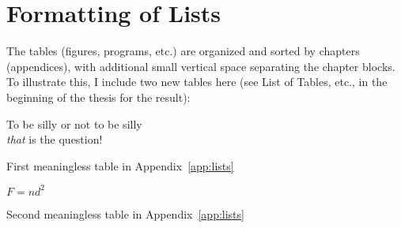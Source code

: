 \section{Formatting of Lists}

The tables (figures, programs, etc.) are organized and sorted by
chapters (appendices), with additional small vertical space separating
the chapter blocks. To illustrate this, I include two new tables here
(see List of Tables, etc., in the beginning of the thesis for the
result):

\begin{table}[htbp]
  \begin{center}
    To be silly or not to be silly\\
    \emph{that} is the question!
    \caption{First meaningless table in Appendix~\ref{app:lists}}
  \end{center}
\end{table}
%
\vspace*{-.3in}
\begin{table}[htbp]
  \begin{center}
    $F = nd^{2}$
    \caption{Second meaningless table in Appendix~\ref{app:lists}}
  \end{center}
\end{table}

